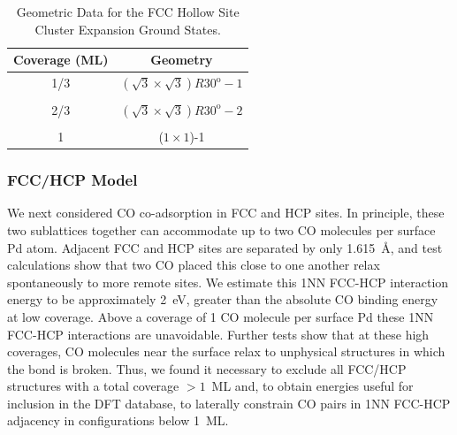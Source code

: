 \documentclass[11pt]{article}
\begin{document}
\begin{table} [t]
	\caption{Geometric Data for the FCC Hollow Site Cluster Expansion Ground States.} 
	\centering
	\begin{tabular} {c c}
		\toprule
		Coverage (ML) & Geometry\\
		\midrule
		1/3                      & $(\sqrt{3}\times\sqrt{3})R30^\mathrm{o}-1$ \ce{CO} \\
		\\
		2/3     & $(\sqrt{3}\times\sqrt{3})R30^\mathrm{o}-2$ \ce{CO} \\
		\\
		1                        & ($1\times1$)-1 \ce{CO} \\
		\bottomrule
	\end{tabular}
	\label{OneSiteGroundStatesTable}
\end{table}

\subsubsection{FCC/HCP Model}
We next considered CO co-adsorption in FCC and HCP sites.  In principle, these two sublattices together can accommodate up to two CO molecules per surface Pd atom.  Adjacent FCC and HCP sites are separated by only 1.615~\AA, and test calculations show that two CO placed this close to one another relax spontaneously to more remote sites.  We estimate this 1NN FCC-HCP interaction energy to be approximately 2~eV, greater than the absolute CO binding energy at low coverage.   
Above a coverage of 1 CO molecule per surface Pd these 1NN FCC-HCP interactions are unavoidable.  Further tests show that at these high coverages, CO molecules near the surface relax to unphysical structures in which the  bond is broken. Thus, we found it necessary to exclude all FCC/HCP structures with a total coverage $> 1$~ML and, to obtain energies useful for inclusion in the DFT database, to laterally constrain CO pairs in 1NN FCC-HCP adjacency in configurations below 1~ML.  
\end{document}
